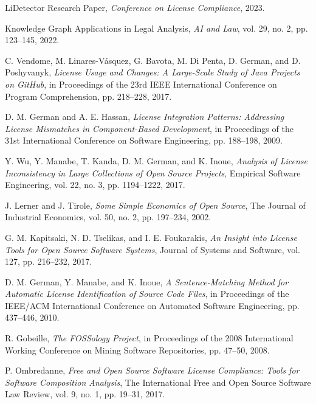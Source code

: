 \documentclass[12pt]{article}
\begin{document}

\begin{thebibliography}{15}

LiDetector Research Paper, 
\textit{Conference on License Compliance}, 2023.

Knowledge Graph Applications in Legal Analysis, 
\textit{AI and Law}, vol. 29, no. 2, pp. 123--145, 2022.

C. Vendome, M. Linares-Vásquez, G. Bavota, M. Di Penta, D. German, and D. Poshyvanyk,
\textit{License Usage and Changes: A Large-Scale Study of Java Projects on GitHub},
in Proceedings of the 23rd IEEE International Conference on Program Comprehension,
pp. 218--228, 2017.

D. M. German and A. E. Hassan,
\textit{License Integration Patterns: Addressing License Mismatches in Component-Based Development},
in Proceedings of the 31st International Conference on Software Engineering,
pp. 188--198, 2009.

Y. Wu, Y. Manabe, T. Kanda, D. M. German, and K. Inoue,
\textit{Analysis of License Inconsistency in Large Collections of Open Source Projects},
Empirical Software Engineering, vol. 22, no. 3, pp. 1194--1222, 2017.

J. Lerner and J. Tirole,
\textit{Some Simple Economics of Open Source},
The Journal of Industrial Economics, vol. 50, no. 2, pp. 197--234, 2002.

G. M. Kapitsaki, N. D. Tselikas, and I. E. Foukarakis,
\textit{An Insight into License Tools for Open Source Software Systems},
Journal of Systems and Software, vol. 127, pp. 216--232, 2017.

D. M. German, Y. Manabe, and K. Inoue,
\textit{A Sentence-Matching Method for Automatic License Identification of Source Code Files},
in Proceedings of the IEEE/ACM International Conference on Automated Software Engineering,
pp. 437--446, 2010.

R. Gobeille,
\textit{The FOSSology Project},
in Proceedings of the 2008 International Working Conference on Mining Software Repositories,
pp. 47--50, 2008.

P. Ombredanne,
\textit{Free and Open Source Software License Compliance: Tools for Software Composition Analysis},
The International Free and Open Source Software Law Review, vol. 9, no. 1, pp. 19--31, 2017.


\end{thebibliography}
\end{document}
